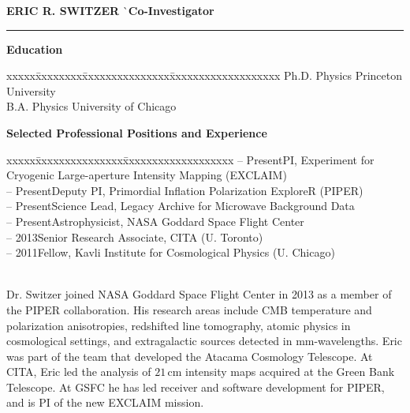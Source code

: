 \documentclass[12pt]{article}
\begin{document}
\vspace{-3mm}
\noindent
\begin{tabbing}
{\bf ERIC R. SWITZER} \` \small{{\bf Co-Investigator}} \\
\end{tabbing}
\vspace{-7mm}
\hrule height 0.7pt

\vspace{5mm}
\addressminimal{\lastupdated}

\small{
\noindent
{\bf Education}
\vspace{-3mm}
\begin{tabbing}
xxxxx\=xxxxxxxx\=xxxxxxxxxxxxxxx\=xxxxxxxxxxxxxxxxxxx\kill
{} \> Ph.D. Physics \> Princeton University \\
 \> B.A. Physics \> University of Chicago \\
\end{tabbing}}

\vspace{-5mm}
\small{
\noindent
{\bf Selected Professional Positions and Experience}
\vspace{-3mm}
\begin{tabbing}
xxxxx\=xxxxxxxxxxxxxxx\=xxxxxxxxxxxxxxxxxxx\kill
{} -- Present\>PI, Experiment for Cryogenic Large-aperture Intensity Mapping (EXCLAIM) \\
 -- Present\>Deputy PI, Primordial Inflation Polarization ExploreR (PIPER) \\
 -- Present\>Science Lead, Legacy Archive for Microwave Background Data \\
 -- Present\>Astrophysicist, NASA Goddard Space Flight Center \\
 -- 2013\>Senior Research Associate, CITA (U. Toronto) \\
 -- 2011\>Fellow, Kavli Institute for Cosmological Physics (U. Chicago) \\
\end{tabbing}}

\vspace{-2mm} \small{ \\ Dr. Switzer joined
NASA Goddard Space Flight Center in 2013 as a member of the PIPER
collaboration. His research areas include CMB temperature and polarization
anisotropies, redshifted line tomography, atomic physics in cosmological
settings, and extragalactic sources detected in mm-wavelengths. Eric was part
of the team that developed the Atacama Cosmology Telescope. At CITA, Eric led
the analysis of $21$\,cm intensity maps acquired at the Green Bank Telescope.
At GSFC he has led receiver and software development for PIPER, and is PI of
the new EXCLAIM mission.}

\vspace{5mm}
\begin{list}{}{%
\setlength{\topsep}{0pt}%
\setlength{\leftmargin}{0.1in}%
\setlength{\listparindent}{-0.1in}%
\setlength{\itemindent}{-0.1in}%
\setlength{\parsep}{\parskip}%
}%

%
\end{list}
\end{document}
